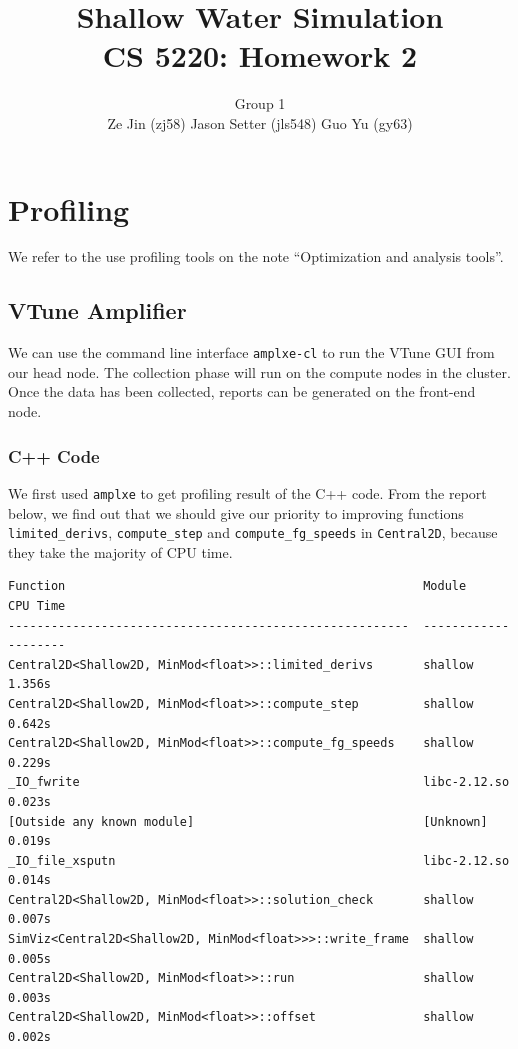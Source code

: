 \documentclass[12pt]{article}
\numberwithin{equation}{section}
\begin{document}
\title{\bf{Shallow Water Simulation \\ CS 5220: Homework 2}}

\author{Group 1 \\ Ze Jin (zj58) \quad Jason Setter (jls548) \quad Guo Yu (gy63)\\}

\date{ }

\maketitle


\section{Profiling}

We refer to the use profiling tools on the note ``Optimization and analysis tools''.

\subsection{VTune Amplifier}

We can use the command line interface \texttt{amplxe-cl} to run the VTune GUI from our head node. The collection phase will run on the compute nodes in the cluster. Once the data has been collected, reports can be generated on the front-end node.

\subsubsection{C++ Code}

We first used \texttt{amplxe} to get profiling result of the C++ code.
From the report below, we find out that we should give our priority to improving functions \texttt{limited\_derivs}, \texttt{compute\_step} and \texttt{compute\_fg\_speeds} in \texttt{Central2D}, because they take the majority of CPU time.

\scriptsize{
\begin{lstlisting}
Function                                                  Module        CPU Time
--------------------------------------------------------  ------------  --------
Central2D<Shallow2D, MinMod<float>>::limited_derivs       shallow         1.356s
Central2D<Shallow2D, MinMod<float>>::compute_step         shallow         0.642s
Central2D<Shallow2D, MinMod<float>>::compute_fg_speeds    shallow         0.229s
_IO_fwrite                                                libc-2.12.so    0.023s
[Outside any known module]                                [Unknown]       0.019s
_IO_file_xsputn                                           libc-2.12.so    0.014s
Central2D<Shallow2D, MinMod<float>>::solution_check       shallow         0.007s
SimViz<Central2D<Shallow2D, MinMod<float>>>::write_frame  shallow         0.005s
Central2D<Shallow2D, MinMod<float>>::run                  shallow         0.003s
Central2D<Shallow2D, MinMod<float>>::offset               shallow         0.002s
\end{lstlisting}
}
\end{document}
